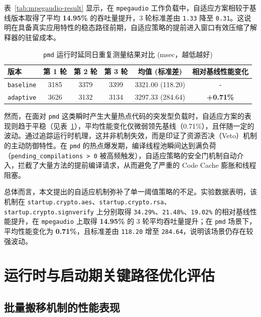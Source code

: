 表~\ref{tab:mpegaudio-result} 显示，在 \texttt{mpegaudio} 工作负载中，自适应方案相较于基线版本取得了平均 \textbf{14.95\%} 的吞吐量提升，3 轮标准差由 \texttt{1.33} 降至 \texttt{0.31}。这说明在具备真实应用特性的稳态路径前期，自适应策略的提前进入窗口有效压缩了解释器的驻留成本。

\begin{table}[htbp]
    \centering
    \small
    \caption{\texttt{pmd} 运行时延同日重复测量结果对比 (msec，越低越好)}
    \label{tab:pmd-result}
    \begin{tabular}{lccccc}
        \hline
        \textbf{版本} & \textbf{第 1 轮} & \textbf{第 2 轮} & \textbf{第 3 轮} & \textbf{均值 (标准差)} & \textbf{相对基线性能变化} \\
        \hline
        \texttt{baseline} & 3185 & 3379 & 3399 & 3321.00 (118.20) & \texttt{-} \\
        \texttt{adaptive} & 3626 & 3132 & 3134 & 3297.33 (284.64) & \textbf{+0.71\%} \\
        \hline
    \end{tabular}
\end{table}

然而，在面对 \texttt{pmd} 这类瞬时产生大量热点代码的突发型负载时，自适应方案的表现则趋于平稳（见表~\ref{tab:pmd-result}），平均性能变化仅微弱领先基线（0.71\%），且伴随一定的波动。通过追踪运行时机理，这并非机制失效，而是印证了资源否决（Veto）机制的主动防御特性。在 \texttt{pmd} 的热点爆发期，编译线程池瞬间达到满负荷（\texttt{pending\_compilations > 0} 被高频触发），自适应策略的安全门机制自动介入，拦截了大量方法的提前编译请求，从而避免了严重的 Code Cache 膨胀和线程阻塞。

总体而言，本文提出的自适应机制弥补了单一阈值策略的不足。实验数据表明，该机制在 \texttt{startup.crypto.aes}、\texttt{startup.crypto.rsa}、\texttt{startup.crypto.signverify} 上分别取得 \texttt{34.29\%}、\texttt{21.48\%}、\texttt{19.02\%} 的相对基线性能提升，在 \texttt{mpegaudio} 上取得 \textbf{14.95\%} 的 3 轮平均吞吐量提升；在 \texttt{pmd} 场景下，平均性能变化为 \textbf{0.71\%}，且标准差由 \texttt{118.20} 增至 \texttt{284.64}，说明该场景仍存在较强波动。

\section{运行时与启动期关键路径优化评估}

\subsection{批量搬移机制的性能表现}

